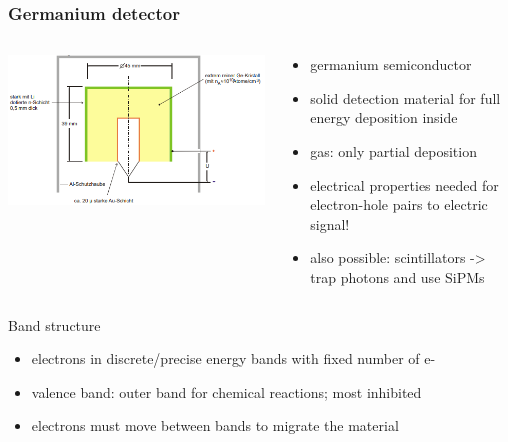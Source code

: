 \documentclass[aspectratio=1610, 9pt]{beamer}
\begin{document}
\begin{frame}\frametitle{Germanium detector}
  \begin{columns}
    \begin{column}[c]{0.48\textwidth}
      \includegraphics[width=\textwidth]{plots/ge.png}
    \end{column}
    \begin{column}[c]{0.48\textwidth}
      \begin{itemize}
        \item germanium semiconductor
        \item solid detection material for full energy deposition inside
        \item gas: only partial deposition
        \item electrical properties needed for electron-hole pairs to electric signal!
        \item also possible: scintillators -> trap photons and use SiPMs
      \end{itemize}
    \end{column}
  \end{columns}
\end{frame}

\begin{frame}{Band structure}
  \begin{itemize}
    \item electrons in discrete/precise energy bands with fixed number of e-
    \item valence band: outer band for chemical reactions; most inhibited
    \item electrons must move between bands to migrate the material
  \end{itemize}
\end{frame}
\end{document}
